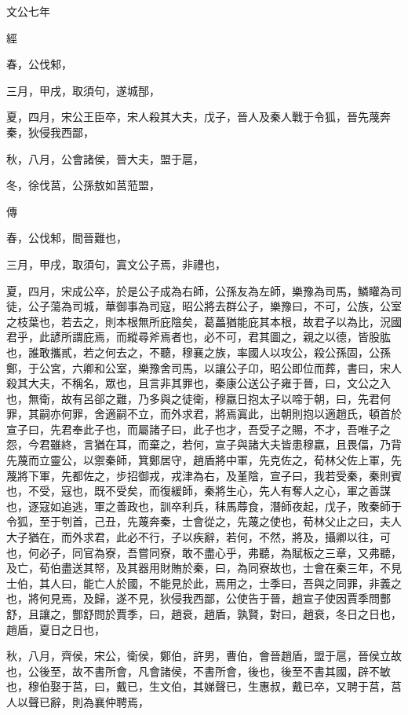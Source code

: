 \documentclass{ctexart}
\begin{document}
文公七年


經



春，公伐邾，

三月，甲戌，取須句，遂城郚，

夏，四月，宋公王臣卒，宋人殺其大夫，戊子，晉人及秦人戰于令狐，晉先蔑奔秦，狄侵我西鄙，

秋，八月，公會諸侯，晉大夫，盟于扈，

冬，徐伐莒，公孫敖如莒蒞盟，

傳



春，公伐邾，間晉難也，

三月，甲戌，取須句，寘文公子焉，非禮也，

夏，四月，宋成公卒，於是公子成為右師，公孫友為左師，樂豫為司馬，鱗矔為司徒，公子蕩為司城，華御事為司寇，昭公將去群公子，樂豫曰，不可，公族，公室之枝葉也，若去之，則本根無所庇陰矣，葛藟猶能庇其本根，故君子以為比，況國君乎，此諺所謂庇焉，而縱尋斧焉者也，必不可，君其圖之，親之以德，皆股肱也，誰敢攜貳，若之何去之，不聽，穆襄之族，率國人以攻公，殺公孫固，公孫鄭，于公宮，六卿和公室，樂豫舍司馬，以讓公子卬，昭公即位而葬，書曰，宋人殺其大夫，不稱名，眾也，且言非其罪也，秦康公送公子雍于晉，曰，文公之入也，無衛，故有呂郤之難，乃多與之徒衛，穆嬴日抱太子以啼于朝，曰，先君何罪，其嗣亦何罪，舍適嗣不立，而外求君，將焉寘此，出朝則抱以適趙氏，頓首於宣子曰，先君奉此子也，而屬諸子曰，此子也才，吾受子之賜，不才，吾唯子之怨，今君雖終，言猶在耳，而棄之，若何，宣子與諸大夫皆患穆嬴，且畏偪，乃背先蔑而立靈公，以禦秦師，箕鄭居守，趙盾將中軍，先克佐之，荀林父佐上軍，先蔑將下軍，先都佐之，步招御戎，戎津為右，及堇陰，宣子曰，我若受秦，秦則賓也，不受，寇也，既不受矣，而復緩師，秦將生心，先人有奪人之心，軍之善謀也，逐寇如追逃，軍之善政也，訓卒利兵，秣馬蓐食，潛師夜起，戊子，敗秦師于令狐，至于刳首，己丑，先蔑奔秦，士會從之，先蔑之使也，荀林父止之曰，夫人大子猶在，而外求君，此必不行，子以疾辭，若何，不然，將及，攝卿以往，可也，何必子，同官為寮，吾嘗同寮，敢不盡心乎，弗聽，為賦板之三章，又弗聽，及亡，荀伯盡送其帑，及其器用財賄於秦，曰，為同寮故也，士會在秦三年，不見士伯，其人曰，能亡人於國，不能見於此，焉用之，士季曰，吾與之同罪，非義之也，將何見焉，及歸，遂不見，狄侵我西鄙，公使告于晉，趙宣子使因賈季問酆舒，且讓之，酆舒問於賈季，曰，趙衰，趙盾，孰賢，對曰，趙衰，冬日之日也，趙盾，夏日之日也，

秋，八月，齊侯，宋公，衛侯，鄭伯，許男，曹伯，會晉趙盾，盟于扈，晉侯立故也，公後至，故不書所會，凡會諸侯，不書所會，後也，後至不書其國，辟不敏也，穆伯娶于莒，曰，戴已，生文伯，其娣聲已，生惠叔，戴已卒，又聘于莒，莒人以聲已辭，則為襄仲聘焉，
\end{document}
